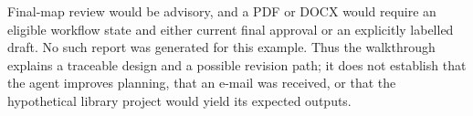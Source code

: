 Final-map review would be advisory, and a PDF or DOCX would require an eligible workflow state and either current final approval or an explicitly labelled draft. No such report was generated for this example. Thus the walkthrough explains a traceable design and a possible revision path; it does not establish that the agent improves planning, that an e-mail was received, or that the hypothetical library project would yield its expected outputs.
